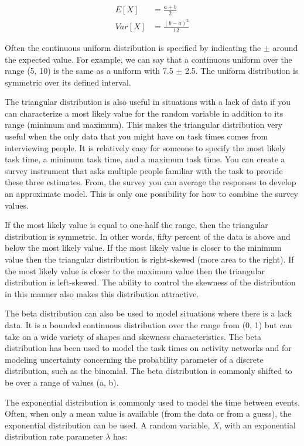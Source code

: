 \documentclass[
]{book}
\theoremstyle{definition}
\theoremstyle{definition}
\theoremstyle{definition}
\theoremstyle{definition}
\theoremstyle{remark}
\begin{document}
\[\begin{aligned}
E[X] & = \frac{a+b}{2} \\
Var[X] & = \frac{(b-a)^2}{12}\end{aligned}\]

Often the continuous uniform distribution is specified by indicating the
\(\pm\) around the expected value. For example, we can say that a
continuous uniform over the range (5, 10) is the same as a uniform with
7.5 \(\pm\) 2.5. The uniform distribution is symmetric over its defined
interval.

The triangular distribution is also useful in situations with a lack of
data if you can characterize a most likely value for the random variable
in addition to its range (minimum and maximum). This makes the
triangular distribution very useful when the only data that you might
have on task times comes from interviewing people. It is relatively easy
for someone to specify the most likely task time, a minimum task time,
and a maximum task time. You can create a survey instrument that asks
multiple people familiar with the task to provide these three estimates.
From, the survey you can average the responses to develop an approximate
model. This is only one possibility for how to combine the survey
values.

If the most likely value is equal to one-half the range, then the
triangular distribution is symmetric. In other words, fifty percent of
the data is above and below the most likely value. If the most likely
value is closer to the minimum value then the triangular distribution is
right-skewed (more area to the right). If the most likely value is
closer to the maximum value then the triangular distribution is
left-skewed. The ability to control the skewness of the distribution in
this manner also makes this distribution attractive.

The beta distribution can also be used to model situations where there
is a lack data. It is a bounded continuous distribution over the range
from (0, 1) but can take on a wide variety of shapes and skewness
characteristics. The beta distribution has been used to model the task
times on activity networks and for modeling uncertainty concerning the
probability parameter of a discrete distribution, such as the binomial.
The beta distribution is commonly shifted to be over a range of values
(a, b).

The exponential distribution is commonly used to model the time between
events. Often, when only a mean value is available (from the data or
from a guess), the exponential distribution can be used. A random
variable, \(X\), with an exponential distribution rate parameter \(\lambda\)
has:
\end{document}
